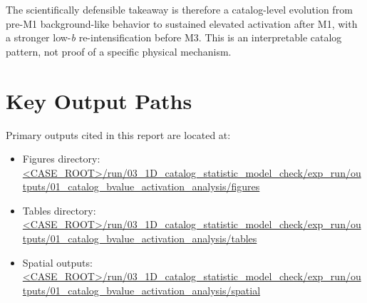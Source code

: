 \documentclass[11pt]{article}
\begin{document}
The scientifically defensible takeaway is therefore a catalog-level evolution from pre-M1 background-like behavior to sustained elevated activation after M1, with a stronger low-\textit{b} re-intensification before M3. This is an interpretable catalog pattern, not proof of a specific physical mechanism.

\section*{Key Output Paths}
Primary outputs cited in this report are located at:
\begin{itemize}
    \item Figures directory: \url{<CASE_ROOT>/run/03_1D_catalog_statistic_model_check/exp_run/outputs/01_catalog_bvalue_activation_analysis/figures}
    \item Tables directory: \url{<CASE_ROOT>/run/03_1D_catalog_statistic_model_check/exp_run/outputs/01_catalog_bvalue_activation_analysis/tables}
    \item Spatial outputs: \url{<CASE_ROOT>/run/03_1D_catalog_statistic_model_check/exp_run/outputs/01_catalog_bvalue_activation_analysis/spatial}
\end{itemize}
\end{document}
